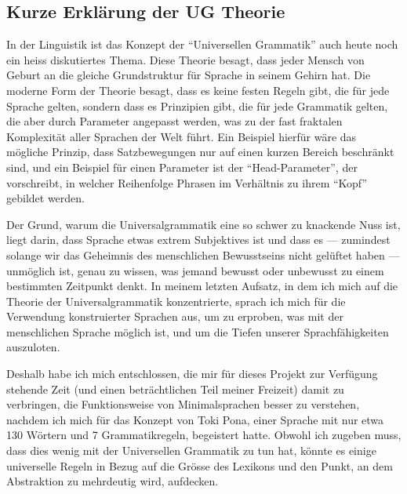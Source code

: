 \documentclass{article}
\begin{document}
\subsection{Kurze Erklärung der UG Theorie}
In der Linguistik ist das Konzept der ``Universellen Grammatik'' auch heute noch ein heiss diskutiertes Thema.
Diese Theorie besagt, dass jeder Mensch von Geburt an die gleiche Grundstruktur für Sprache in seinem Gehirn hat.
Die moderne Form der Theorie besagt, dass es keine festen Regeln gibt, die für jede Sprache gelten,
sondern dass es Prinzipien gibt, die für jede Grammatik gelten, die aber durch Parameter angepasst werden,
was zu der fast fraktalen Komplexität aller Sprachen der Welt führt. Ein Beispiel hierfür wäre das mögliche Prinzip,
dass Satzbewegungen nur auf einen kurzen Bereich beschränkt sind, und ein Beispiel für einen Parameter ist der ``Head-Parameter'',
der vorschreibt, in welcher Reihenfolge Phrasen im Verhältnis zu ihrem ``Kopf'' gebildet werden.\citep{ChUGAI}

Der Grund, warum die Universalgrammatik eine so schwer zu knackende Nuss ist, liegt darin, dass Sprache etwas extrem Subjektives
ist und dass es --- zumindest solange wir das Geheimnis des menschlichen Bewusstseins nicht gelüftet haben --- unmöglich ist,
genau zu wissen, was jemand bewusst oder unbewusst zu einem bestimmten Zeitpunkt denkt. In meinem letzten Aufsatz,
in dem ich mich auf die Theorie der Universalgrammatik konzentrierte, sprach ich mich für die Verwendung konstruierter Sprachen aus,
um zu erproben, was mit der menschlichen Sprache möglich ist, und um die Tiefen unserer Sprachfähigkeiten auszuloten.

Deshalb habe ich mich entschlossen, die mir für dieses Projekt zur Verfügung stehende Zeit (und einen beträchtlichen
Teil meiner Freizeit) damit zu verbringen, die Funktionsweise von Minimalsprachen besser zu verstehen,
nachdem ich mich für das Konzept von Toki Pona, einer Sprache mit nur etwa 130 Wörtern und 7 Grammatikregeln\citep{Lang14},
begeistert hatte. Obwohl ich zugeben muss, dass dies wenig mit der Universellen Grammatik zu tun hat,
könnte es einige universelle Regeln in Bezug auf die Grösse des Lexikons und den Punkt,
an dem Abstraktion zu mehrdeutig wird, aufdecken.
\end{document}
